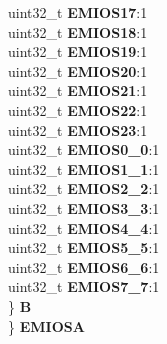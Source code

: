 \begin{DoxyCompactItemize}
\begin{tabbing}
\>\>uint32\_t {\bfseries EMIOS17}:1\\
\>\>uint32\_t {\bfseries EMIOS18}:1\\
\>\>uint32\_t {\bfseries EMIOS19}:1\\
\>\>uint32\_t {\bfseries EMIOS20}:1\\
\>\>uint32\_t {\bfseries EMIOS21}:1\\
\>\>uint32\_t {\bfseries EMIOS22}:1\\
\>\>uint32\_t {\bfseries EMIOS23}:1\\
\>\>uint32\_t {\bfseries EMIOS0\_0}:1\\
\>\>uint32\_t {\bfseries EMIOS1\_1}:1\\
\>\>uint32\_t {\bfseries EMIOS2\_2}:1\\
\>\>uint32\_t {\bfseries EMIOS3\_3}:1\\
\>\>uint32\_t {\bfseries EMIOS4\_4}:1\\
\>\>uint32\_t {\bfseries EMIOS5\_5}:1\\
\>\>uint32\_t {\bfseries EMIOS6\_6}:1\\
\>\>uint32\_t {\bfseries EMIOS7\_7}:1\\
\>\} {\bfseries B}\\
\} {\bfseries EMIOSA}\\


\end{tabbing}
\end{DoxyCompactItemize}
